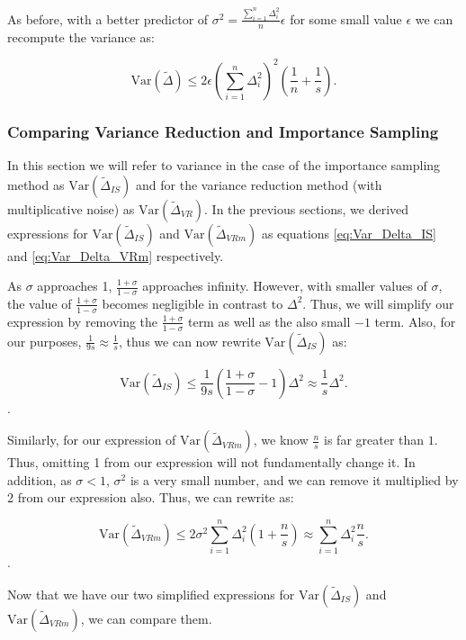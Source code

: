 \documentclass[11pt, margin=1in]{article}
\begin{document}
As before, with a better predictor of $\sigma^2 = \frac{\sum_{i = 1}^{n}\Delta_i^2}{n} \epsilon$ for some small value $\epsilon$ we can recompute the variance as:

\[
\mathrm{Var}\left(\tilde{\Delta}\right) \leq 2\epsilon\left(\sum_{i = 1}^{n}\Delta_i^2\right)^2\left(\frac{1}{n} + \frac{1}{s}\right).
\]

\subsubsection{Comparing Variance Reduction and Importance Sampling}
\label{appendix:variance-comparison}

In this section we will refer to variance in the case of the importance sampling method as $\mathrm{Var}\left(\tilde{\Delta}_{IS}\right)$ and for the variance reduction method (with multiplicative noise) as $\mathrm{Var}\left(\tilde{\Delta}_{VR}\right)$.
In the previous sections, we derived expressions for $\mathrm{Var}\left(\tilde{\Delta}_{IS}\right)$ and $\mathrm{Var}\left(\tilde{\Delta}_{VRm}\right)$ as equations \eqref{eq:Var_Delta_IS} and \eqref{eq:Var_Delta_VRm} respectively.

As $\sigma$ approaches 1, $\frac{1 + \sigma}{1 - \sigma}$ approaches infinity.
However, with smaller values of $\sigma$, the value of $\frac{1 + \sigma}{1 - \sigma}$ becomes negligible in contrast to $\Delta^2$.
Thus, we will simplify our expression by removing the $\frac{1 + \sigma}{1 - \sigma}$ term as well as the also small $-1$ term.
Also, for our purposes, $\frac{1}{9s} \approx \frac{1}{s}$, thus we can now rewrite $\mathrm{Var}\left(\tilde{\Delta}_{IS}\right)$ as:

\[
\mathrm{Var}\left(\tilde{\Delta}_{IS}\right) \leq \frac{1}{9s} \left(\frac{1 + \sigma}{1 - \sigma} - 1\right) \Delta^2 \approx \frac{1}{s} \Delta^2.
\].

Similarly, for our expression of $\mathrm{Var}\left(\tilde{\Delta}_{VRm}\right)$, we know $\frac{n}{s}$ is far greater than $1$.
Thus, omitting 1 from our expression will not fundamentally change it.
In addition, as $\sigma < 1$, $\sigma^2$ is a very small number, and we can remove it multiplied by 2 from our expression also.
Thus, we can rewrite as:

\[
\mathrm{Var}\left(\tilde{\Delta}_{VRm}\right) \leq 2\sigma^2\sum_{i = 1}^{n} \Delta_i^2\left(1 + \frac{n}{s}\right) \approx \sum_{i = 1}^{n} \Delta_i^2\frac{n}{s}.
\].

Now that we have our two simplified expressions for $\mathrm{Var}\left(\tilde{\Delta}_{IS}\right)$ and $\mathrm{Var}\left(\tilde{\Delta}_{VRm}\right)$, we can compare them.
\end{document}
